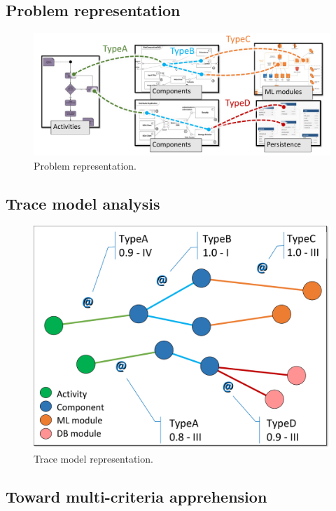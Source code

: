 \subsection{Problem representation}
\begin{figure}[h]     
	\centering
	\includegraphics[width=.8\linewidth]{images/energy2.pdf} 
	\caption{Problem representation.}
	\label{fig:energy2}
\end{figure}

\subsection{Trace model analysis}
\begin{figure}[h]     
	\centering
	\includegraphics[width=.5\linewidth]{images/energy3.pdf}
	\caption{Trace model representation.}
	\label{fig:energy3}
\end{figure}

\subsection{Toward multi-criteria apprehension}

